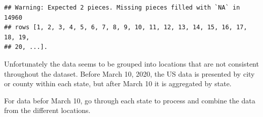 \documentclass[]{article}
\newenvironment{Shaded}{\begin{snugshade}}{\end{snugshade}}
\newcommand{\DataTypeTok}[1]{\textcolor[rgb]{0.13,0.29,0.53}{#1}}
\newcommand{\DecValTok}[1]{\textcolor[rgb]{0.00,0.00,0.81}{#1}}
\newcommand{\KeywordTok}[1]{\textcolor[rgb]{0.13,0.29,0.53}{\textbf{#1}}}
\newcommand{\NormalTok}[1]{#1}
\newcommand{\OperatorTok}[1]{\textcolor[rgb]{0.81,0.36,0.00}{\textbf{#1}}}
\newcommand{\StringTok}[1]{\textcolor[rgb]{0.31,0.60,0.02}{#1}}
\begin{document}
\begin{verbatim}
## Warning: Expected 2 pieces. Missing pieces filled with `NA` in 14960
## rows [1, 2, 3, 4, 5, 6, 7, 8, 9, 10, 11, 12, 13, 14, 15, 16, 17, 18, 19,
## 20, ...].
\end{verbatim}

Unfortunately the data seems to be grouped into locations that are not
consistent throughout the dataset. Before March 10, 2020, the US data is
presented by city or county within each state, but after March 10 it is
aggregated by state.

For data befor March 10, go through each state to process and combine
the data from the different locations.

\begin{Shaded}
\end{Shaded}
\end{document}

